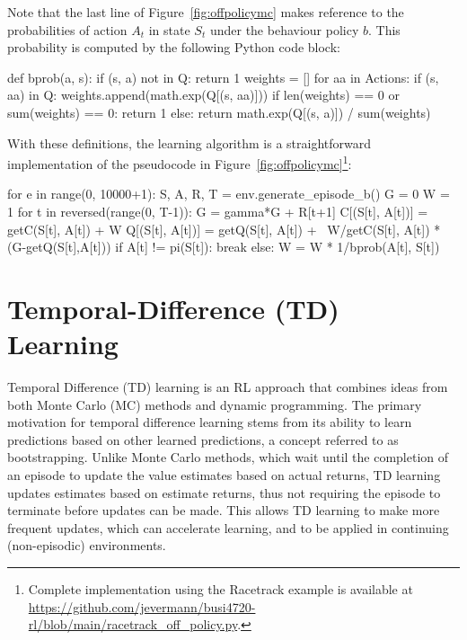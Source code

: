 Note that the last line of Figure~\ref{fig:offpolicymc} makes reference to the probabilities of action $A_t$ in state $S_t$ under the behaviour policy $b$. This probability is computed by the following Python code block:

\begin{samepage}
\begin{pythoncode}
def bprob(a, s):
    if (s, a) not in Q:
        return 1
    weights = []
    for aa in Actions:
        if (s, aa) in Q:
            weights.append(math.exp(Q[(s, aa)]))
    if len(weights) == 0 or sum(weights) == 0:
        return 1
    else:
        return math.exp(Q[(s, a)]) / sum(weights)
\end{pythoncode}
\end{samepage}

With these definitions, the learning algorithm is a straightforward implementation of the pseudocode in Figure~\ref{fig:offpolicymc}\footnote{Complete implementation using the Racetrack example is available at \url{https://github.com/jevermann/busi4720-rl/blob/main/racetrack_off_policy.py}.}:

\begin{samepage}
\begin{pythoncode}
for e in range(0, 10000+1):
    S, A, R, T = env.generate_episode_b()
    G = 0
    W = 1
    for t in reversed(range(0, T-1)):
        G = gamma*G + R[t+1]
        C[(S[t], A[t])] = getC(S[t], A[t]) + W
        Q[(S[t], A[t])] = getQ(S[t], A[t]) + \
               W/getC(S[t], A[t]) * (G-getQ(S[t],A[t]))
        if A[t] != pi(S[t]):
            break
        else:
            W = W * 1/bprob(A[t], S[t])
\end{pythoncode}
\end{samepage}

\section{Temporal-Difference (TD) Learning}

Temporal Difference (TD) learning is an RL approach that combines ideas from both Monte Carlo (MC) methods and dynamic programming. The primary motivation for temporal difference learning stems from its ability to learn predictions based on other learned predictions, a concept referred to as bootstrapping. Unlike Monte Carlo methods, which wait until the completion of an episode to update the value estimates based on actual returns, TD learning updates estimates based on estimate returns, thus not requiring the episode to terminate before updates can be made. This allows TD learning to make more frequent updates, which can accelerate learning, and to be applied in continuing (non-episodic) environments.

